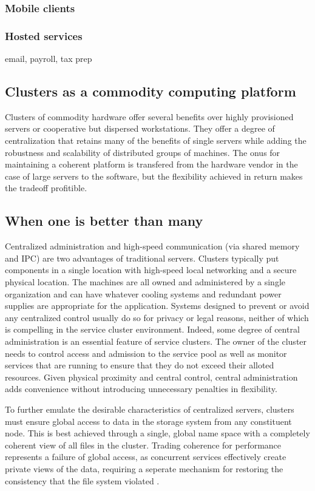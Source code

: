 \subsubsection{Mobile clients}
\subsubsection{Hosted services}
email, payroll, tax prep

\subsection{Clusters as a commodity computing platform}

Clusters of commodity hardware offer several benefits over highly provisioned servers or cooperative but dispersed workstations. They offer a degree of centralization that retains many of the benefits of single servers while adding the robustness and scalability of distributed groups of machines. The onus for maintaining a coherent platform is transfered from the hardware vendor in the case of large servers to the software, but the flexibility achieved in return makes the tradeoff profitible.

\subsection{When one is better than many}

Centralized administration and high-speed communication (via shared memory and IPC) are two advantages of traditional servers. Clusters typically put components in a single location with high-speed local networking and a secure physical location. The machines are all owned and administered by a single organization and can have whatever cooling systems and redundant power supplies are appropriate for the application. Systems designed to prevent or avoid any centralized control usually do so for privacy or legal reasons, neither of which is compelling in the service cluster environment. Indeed, some degree of central administration is an essential feature of service clusters. The owner of the cluster needs to control access and admission to the service pool as well as monitor services that are running to ensure that they do not exceed their alloted resources. Given physical proximity and central control, central administration adds convenience without introducing unnecessary penalties in flexibility.

To further emulate the desirable characteristics of centralized servers, clusters must ensure global access to data in the storage system from any constituent node. This is best achieved through a single, global name space with a completely coherent view of all files in the cluster. Trading coherence for performance represents a failure of global access, as concurrent services effectively create private views of the data, requiring a seperate mechanism for restoring the consistency that the file system violated \cite{birrell93}.

